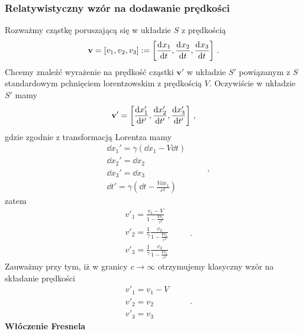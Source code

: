 \documentclass[../main.tex]{subfiles}
\begin{document}
\subsubsection{Relatywistyczny wzór na dodawanie prędkości}
Rozważmy cząstkę poruszającą się w układzie \(S\) z prędkością
\begin{equation*}
    \mathbf{v}=[v_1,v_2,v_3]:=\left[\dv[]{x_1}{t},\dv[]{x_2}{t},\dv[]{x_3}{t}\right]\,.
\end{equation*}
Chcemy znaleźć wyrażenie na prędkość cząstki \(\mathbf{v}'\) w układzie \(S'\) powiązanym z \(S\) standardowym pchnięciem lorentzowskim z prędkością \(V\). Oczywiście w układzie \(S'\) mamy
\begin{equation*}
    \mathbf{v}'=\left[\dv{x_{1}'}{t'},\dv{x'_2}{t'},\dv{x'_3}{t'}\right]\,,
\end{equation*}
gdzie zgodnie z transformacją Lorentza mamy
\begin{equation*}
    \begin{split}
        &\dd{x_1'}=\gamma(\dd{x_1}-V\dd{t})\\
        &\dd{x_2'}=\dd{x_2}\\
        &\dd{x_3'}=\dd{x_3}\\
        &\dd{t'}=\gamma\left(\dd{t}-\frac{V\dd{x_1}}{c^2}\right)
    \end{split}\quad\quad\,,
\end{equation*}
zatem
\begin{equation*}
    \begin{split}
        &v'_1=\frac{v_1-V}{1-\frac{Vv_1}{c^2}}\\
        &v'_2=\frac{1}{\gamma}\frac{v_2}{1-\frac{Vv_1}{c^2}}\\
        &v'_3=\frac{1}{\gamma}\frac{v_3}{1-\frac{Vv_1}{c^2}}
    \end{split}\quad\quad\,.
\end{equation*}
Zauważmy przy tym, iż w granicy \(c\to\infty\) otrzymujemy klasyczny wzór na składanie prędkości
\begin{equation*}
    \begin{split}
        &v'_1=v_1-V\\
        &v'_2= v_2\\
        &v'_3= v_3
    \end{split}\quad\quad\,.
\end{equation*}
\textbf{Włóczenie Fresnela}
\medskip
\end{document}
